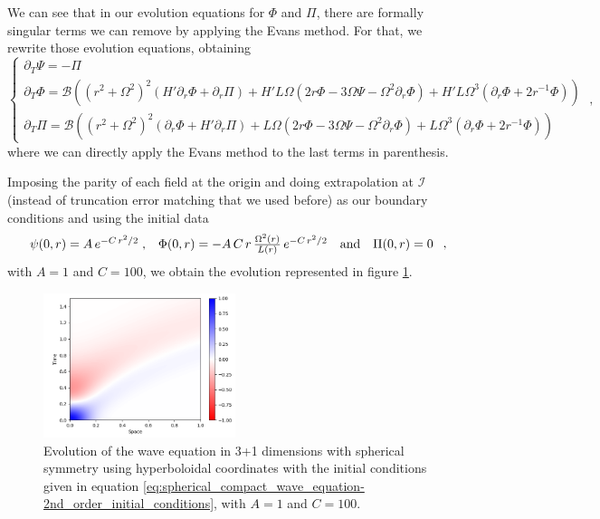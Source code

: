 We can see that in our evolution equations for $\Phi$ and $\Pi$, there are formally singular terms we can remove by applying the Evans method. For that, we rewrite those evolution equations, obtaining
%
\begin{equation}
    \left\{ \begin{array}{l} 
        \partial_T \Psi = - \Pi \\ 
        \partial_T \Phi = \mathcal{B}\left((r^2 + \Omega^2)^2 \left(H' \partial_r \Phi + \partial_r\Pi\right) + H' L \Omega \left( 2r\Phi - 3 \Omega \Psi - \Omega^2 \partial_r \Phi\right) + H' L\Omega^3\left( \partial_r \Phi + 2 r^{-1}\Phi\right) \right)\\
        \partial_T \Pi = \mathcal{B}\left((r^2 + \Omega^2)^2 \left(\partial_r \Phi + H' \partial_r\Pi\right) + L \Omega \left( 2r\Phi - 3 \Omega \Psi - \Omega^2 \partial_r\Phi \right) + L \Omega^3\left( \partial_r \Phi + 2 r^{-1}\Phi \right) \right)
    \end{array} \right. \; ,
\end{equation}
%
where we can directly apply the Evans method to the last terms in parenthesis.

Imposing the parity of each field at the origin and doing extrapolation at $\mathscr{I}$ (instead of truncation error matching that we used before) as our boundary conditions and using the initial data
%
\begin{equation}
    \begin{array}{c c c c}
        \psi(0,r) = A \, e^{-C \, r^2/2} \; , & \Phi(0,r) = - A \,C \, r \, \frac{\Omega^2(r)}{L(r)} \, e^{-C \, r^2/2} & \text{and} & \Pi(0,r) = 0
    \end{array} \; ,
    \label{eq:spherical_compact_wave_equation-2nd_order_initial_conditions}
\end{equation}
with $A = 1$ and $C = 100$, we obtain the evolution represented in figure \ref{fig:spherical_compact_wave_equation-2nd_order}.

\begin{figure}[h]
    \centering
    \includegraphics[width=0.5\textwidth]{Images/Wave_Equation_3+1_Spherical-Solution.png}
    \caption{Evolution of the wave equation in 3+1 dimensions with spherical symmetry using hyperboloidal coordinates with the initial conditions given in equation \eqref{eq:spherical_compact_wave_equation-2nd_order_initial_conditions}, with $A = 1$ and $C = 100$.}
    \label{fig:spherical_compact_wave_equation-2nd_order}
\end{figure}

